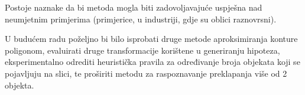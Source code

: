 \documentclass[lmodern, utf8, seminar, numeric]{fer}
\begin{document}
Postoje naznake da bi metoda mogla biti zadovoljavajuće uspješna nad neumjetnim primjerima (primjerice, u industriji, gdje su oblici raznovrsni).

U budućem radu poželjno bi bilo isprobati druge metode aproksimiranja konture poligonom, evaluirati druge transformacije korištene u generiranju hipoteza,  eksperimentalno odrediti heuristička pravila za određivanje broja objekata koji se pojavljuju na slici, te proširiti metodu za raspoznavanje preklapanja više od 2 objekta.



\end{document}
